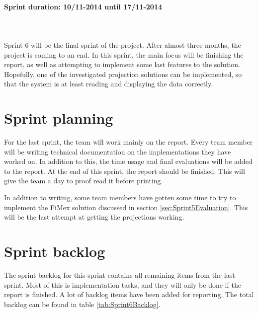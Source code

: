 \documentclass[11pt,a4paper,titlepage,oneside]{report}
\begin{document}
\paragraph{Sprint duration: 10/11-2014 until 17/11-2014} \hfill \\
\\
\noindent
Sprint 6 will be the final sprint of the project. After almost three months, the project is coming to an end. In this sprint, the main focus will be finishing the report, as well as attempting to implement some last features to the solution. Hopefully, one of the investigated projection solutions can be implemented, so that the system is at least reading and displaying the data correctly.
\section{Sprint planning}
For the last sprint, the team will work mainly on the report. Every team member will be writing technical documentation on the implementations they have worked on. In addition to this, the time usage and final evaluations will be added to the report. At the end of this sprint, the report should be finished. This will give the team a day to proof read it before printing. 

In addition to writing, some team members have gotten some time to try to implement the FiMex solution discussed in section \ref{sec:Sprint5Evaluation}. This will be the last attempt at getting the projections working. 

\section{Sprint backlog}
\label{sec:Sprint6Backlog}
The sprint backlog for this sprint contains all remaining items from the last sprint. Most of this is implementation tasks, and they will only be done if the report is finished. A lot of backlog items have been added for reporting. The total backlog can be found in table \ref{tab:Sprint6Backlog}.
\end{document}
